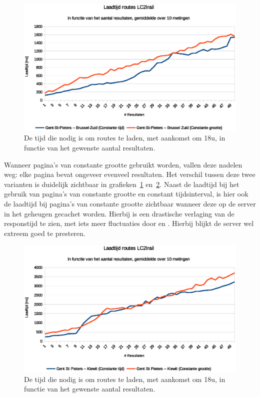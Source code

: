 \begin{figure}[h]
	\centering
	\includegraphics[width=1.00\textwidth]{images/Laadtijd_routes_Gent-St-Pieters_Brussel-Zuid.eps}
	
	\caption[Laadtijd routes tussen Gent en Brussel in functie van aantal resultaten]{De tijd die nodig is om routes te laden, met aankomst om 18u, in functie van het gewenste aantal resultaten.}
	\label{fig:responsetimeperresultsrouteBruSouth}
\end{figure} 

Wanneer pagina's van constante grootte gebruikt worden, vallen deze nadelen weg: elke pagina bevat ongeveer evenveel resultaten. Het verschil tussen deze twee varianten is duidelijk zichtbaar in grafieken~\ref{fig:responsetimeperresultsrouteBruSouth} en~\ref{fig:responsetimeperresultsrouteKiewit}. Naast de laadtijd bij het gebruik van pagina's van constante grootte en constant tijdsinterval, is hier ook de laadtijd bij pagina's van constante grootte zichtbaar wanneer deze op de server in het geheugen gecachet worden. Hierbij is een drastische verlaging van de responstijd te zien, met iets meer fluctuaties door  en . Hierbij blijkt de server wel extreem goed te presteren.

\begin{figure}[h]
	\centering
	\includegraphics[width=1.00\textwidth]{images/Laadtijd_routes_Gent-St-Pieters_Kiewit.eps}	\caption[Laadtijd van routes tussen Gent en Kiewit in functie van aantal resultaten]{De tijd die nodig is om routes te laden, met aankomst om 18u, in functie van het gewenste aantal resultaten.}
	\label{fig:responsetimeperresultsrouteKiewit}
\end{figure}

